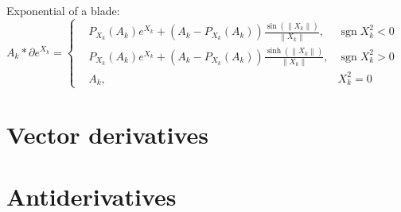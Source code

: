 \documentclass[a4paper,12pt]{article}
\providecommand{\norm}[1]{\left\lVert#1\right\rVert}
\DeclareMathOperator{\sign}{sgn}
\begin{document}
Exponential of a blade:
\begin{equation}
A_k *\partial e^{X_k} = \left\{\begin{aligned}
&P_{X_k}(A_k) e^{X_k} + (A_k - P_{X_k}(A_k)) \frac{\sin(\norm{X_k})}{\norm{X_k}}, &\sign{X_k^2} < 0&\\
&P_{X_k}(A_k) e^{X_k} + (A_k - P_{X_k}(A_k)) \frac{\sinh(\norm{X_k})}{\norm{X_k}}, &\sign{X_k^2} > 0&\\
&A_k, &X_k^2 = 0&
\end{aligned} \right.
\end{equation}

\section{Vector derivatives}

\section{Antiderivatives}


\printbibliography[heading=bibintoc, title={References}]
\end{document}
